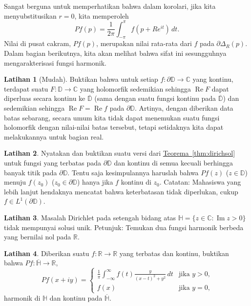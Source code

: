 \documentclass[12pt,openany]{book}
\renewcommand{\Re}{\operatorname{Re}}
\renewcommand{\Im}{\operatorname{Im}}
\newcommand{\C}{{\mathbb{C}}}
\newcommand{\R}{{\mathbb{R}}}
\newcommand{\D}{{\mathbb{D}}}
\newcommand{\bH}{{\mathbb{H}}}
\theoremstyle{plain}
\theoremstyle{remark}
\theoremstyle{definition}
\newenvironment{exbox}{%
    \def\FrameCommand{\vrule width 1pt \relax\hspace{10pt}}%
    \MakeFramed{\advance\hsize-\width\FrameRestore}%
}{%
    \endMakeFramed
}
\theoremstyle{exercise}
\newtheorem{exercise}{Latihan}[section]
\theoremstyle{example}
\newcommand{\thmref}[1]{\hyperref[#1]{Teorema~\ref*{#1}}}
\begin{document}

Sangat berguna untuk memperhatikan bahwa
dalam korolari, jika kita menyubstitusikan $r=0$, kita memperoleh
\begin{equation} \label{eq:averageofPf}
Pf(p) = \frac{1}{2\pi} \int_{-\pi}^{\pi}f(p + R e^{it}) \, dt .
\end{equation}
Nilai di pusat cakram, $Pf(p)$, merupakan nilai
rata-rata dari $f$ pada $\partial \Delta_R(p)$.
Dalam bagian berikutnya, kita akan melihat bahwa sifat ini sesungguhnya mengarakterisasi
fungsi harmonik.

\begin{exbox}
\begin{exercise}[Mudah]
Buktikan bahwa untuk setiap $f \colon \partial \D \to \C$ yang kontinu,
terdapat suatu $F \colon \D \to \C$ yang holomorfik sedemikian sehingga $\Re F$ dapat diperluas
secara kontinu ke $\overline{\D}$ (sama dengan suatu fungsi kontinu pada
$\overline{\D}$) dan sedemikian sehingga $\Re F = \Re f$ pada $\partial \D$.
Artinya, dengan diberikan data batas sebarang, secara umum kita tidak dapat menemukan suatu
fungsi holomorfik dengan nilai-nilai batas tersebut, tetapi setidaknya kita dapat melakukannya
untuk bagian real.
\end{exercise}

\begin{exercise} \label{exercise:dirichDwithsings}
Nyatakan dan buktikan suatu versi dari \thmref{thm:dirichsol} untuk fungsi yang
terbatas pada $\partial \D$ dan kontinu di semua kecuali berhingga banyak titik pada
$\partial \D$. Tentu saja kesimpulannya haruslah bahwa $Pf(z)$ ($z \in
\D$) menuju
$f(z_0)$ ($z_0 \in \partial \D$) hanya jika $f$ kontinu di $z_0$.
Catatan: Mahasiswa yang lebih lanjut hendaknya mencatat bahwa keterbatasan tidak diperlukan,
cukup $f \in L^1(\partial \D)$.
\end{exercise}

\begin{exercise} \label{exercise:upperhalfplanedirichlet}
Masalah Dirichlet pada setengah bidang atas $\bH = \{ z \in \C : \Im z > 0 \}$
tidak mempunyai solusi unik. Petunjuk: Temukan dua
fungsi harmonik berbeda yang bernilai nol pada $\R$.
\end{exercise}

\begin{exercise}
\pagebreak[2]
Diberikan suatu $f \colon \R \to \R$ yang terbatas dan kontinu, buktikan bahwa
$Pf \colon \overline{\bH} \to \R$,
\begin{equation*}
Pf(x+iy)
=
\begin{cases}
\frac{1}{\pi}
\int_{-\infty}^{\infty} f(t) \frac{y}{{(x-t)}^2+y^2} \, dt
&
\text{jika $y > 0$,} \\
f(x) & \text{jika $y=0$,}
\end{cases}
\end{equation*}
harmonik di $\bH$ dan kontinu pada $\overline{\bH}$.
\end{exercise}


\end{exbox}
\end{document}
